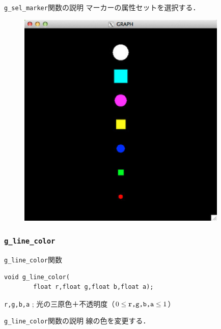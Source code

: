 \documentclass[platex,a4paper,12pt]{jsarticle}%
\begin{document}
\begin{itembox}[l]{\texttt{g\_sel\_marker}関数の説明}
マーカーの属性セットを選択する．
\end{itembox}

\begin{figure}[htb]
\centering
\includegraphics[width=100mm]{Canvas_g_marker.eps}
\end{figure}


\clearpage
\subsubsection{\texttt{g\_line\_color}}

\begin{itembox}[l]{\texttt{g\_line\_color}関数}
\begin{verbatim}
void g_line_color(
        float r,float g,float b,float a);
\end{verbatim}
\verb|r,g,b,a| ; 光の三原色＋不透明度（$0\leq \verb|r,g,b,a| \leq 1$）
\end{itembox}

\begin{itembox}[l]{\texttt{g\_line\_color}関数の説明}
線の色を変更する．
\end{itembox}
\end{document}
